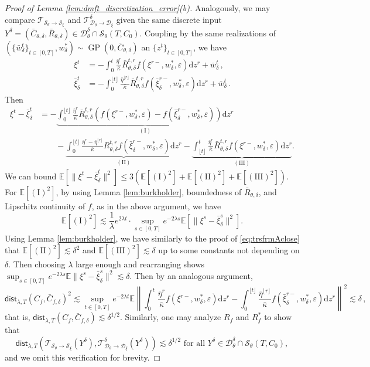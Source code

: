 \documentclass[11pt,letterpaper,reqno]{amsart}
\theoremstyle{definition}
\def\eps{\varepsilon}
\def\d{\mathrm{d}}
\def\E{\mathbb{E}}
\def\GP{\operatorname{GP}}
\def\cS{\mathcal{S}}
\def\cD{\mathcal{D}}
\def\trsfrmB{\mathcal{T}_{{\mathcal{S}}_\theta \to \mathcal{S}_\xi}}
\def\trsfrmDB{\mathcal{T}^\delta_{{\mathcal{D}}_\theta \to \mathcal{D}_\xi}}
\newcommand{\lbddst}[2]{\mathsf{dist}_{\lambda,T}(#1,#2)}
\newcommand{\flr}[1]{{\lfloor {#1} \rfloor}}
\newcommand{\norm}[1]{\|#1\|}
\newcommand{\prn}[1]{\left({#1}\right)} %
\newcommand{\brk}[1]{\left[{#1}\right]} %
\begin{document}
\begin{proof}[Proof of Lemma \ref{lem:dmft_discretization_error}(b)]
Analogously, we may compare $\trsfrmB$
and $\trsfrmDB$ given the same discrete input $Y^\delta=(\bar C_{\theta,\delta},\bar R_{\theta,\delta}) \in \cD_\theta^\delta \cap \cS_\theta(T,C_0)$. Coupling by the same realizations of $(\{\bar w_\delta^t\}_{t \in [0,T]},w^*_\delta) \sim \GP(0,\bar C_{\theta,\delta})$ an $\{z^t\}_{t \in [0,T]}$, we have
\begin{align*}
    \xi^t&={-}\int_0^{{t}} \frac{\bar\eta^{{r}}}{\bar\kappa} \bar R_{\theta,\delta}^{t,r}
f(\xi^{r-},w_\delta^*,\eps)\d z^r+\bar
w^t_\delta\, , \\
    \bar\xi^t_\delta&={-}\int_0^{\flr{t}} \frac{\bar\eta^{\flr{r}}}{\bar\kappa} \bar R_{\theta,\delta}^{t,r}
f(\bar\xi^{r-}_\delta,w_\delta^*,\eps)\d z^r+\bar
w^t_\delta \, .
\end{align*}
Then 
\begin{align*}
    \xi^t - \bar\xi^t_\delta &= - \underbrace{\int_0^{\flr{t}} \frac{\bar\eta^{{r}}}{\bar\kappa} \bar R_{\theta,\delta}^{t,r} \prn{f(\xi^{r-},w_\delta^*,\eps) - f(\bar\xi^{r-}_\delta,w_\delta^*,\eps)} \d z^r}_{(\mathrm{I})} \nonumber\\
    &\qquad- \underbrace{\int_0^{\flr{t}} \frac{\bar\eta^r - \bar\eta^{\flr{r}}}{\bar\kappa}R_{\theta,\delta}^{t,r} {f(\bar\xi^{r-}_\delta,w_\delta^*,\eps)} \d z^r}_{(\mathrm{II})} -  \underbrace{\int_{\flr{t}}^t \frac{\bar\eta^{{r}}}{\bar\kappa} \bar R_{\theta,\delta}^{t,r}
f(\xi^{r-},w_\delta^*,\eps)\d z^r}_{(\mathrm{III})}. 
\end{align*}
We can bound $\E[\norm{\xi^t - \bar\xi^t_\delta}^2] \leq 3(\E[(\mathrm{I})^2]+ \E[(\mathrm{II})^2] + \E[(\mathrm{III})^2])$.
For $\E[(\mathrm{I})^2]$, by using Lemma \ref{lem:burkholder}, boundedness of $\bar R_{\theta,\delta}$, and Lipschitz continuity of $f$, as in the above argument, we have
\[\E[(\mathrm{I})^2] \lesssim
\frac{1}{\lambda}e^{2\lambda t}\cdot\sup_{s\in[0,T]} e^{-2\lambda s}
\E\brk{\norm{\xi^s-\bar \xi^s_\delta}^2}.\]
Using Lemma \ref{lem:burkholder}, we have similarly to the proof of \eqref{eq:trsfrmAclose} that $\E[(\mathrm{II})^2] \lesssim \delta^2 $ and $\E[(\mathrm{III})^2] \lesssim \delta $ up to some constants not depending on $\delta$. Then choosing $\lambda$ large enough and rearranging shows $\sup_{s\in[0,T]} e^{-2\lambda s}
\E\norm{\xi^s-\bar \xi^s_\delta}^2 \lesssim \delta$. Then by an analogous argument,
\[
\lbddst{C_f}{\bar C_{f,\delta}}^2 \lesssim \sup_{t\in [0,T]} e^{-2\lambda t}\E \left\|\int_0^t \frac{\bar\eta^r}{\bar \kappa}f(\xi^{r-},w^*_\delta,\eps) \d z^r- \int_0^{\flr{t}} \frac{\bar\eta^{\flr{r}}}{\bar \kappa}f(\bar\xi^{r-}_\delta,w^*_\delta,\eps)\d z^r\right\|^2 \lesssim \delta\,,
\]
that is,
$\lbddst{C_f}{\bar C_{f,\delta}} \lesssim \delta^{1/2}$.
Similarly, one may analyze $R_f$ and $R_f^*$ to show that
\begin{equation}\label{eq:trsfrmBclose}
\lbddst{\trsfrmB(Y^\delta)}{\trsfrmDB(Y^\delta)} \lesssim \delta^{1/2}
\text{ for all } Y^\delta \in \cD_\theta^\delta \cap \cS_\theta(T,C_0),
\end{equation}
and we omit this verification for brevity.


\end{proof}
\end{document}
